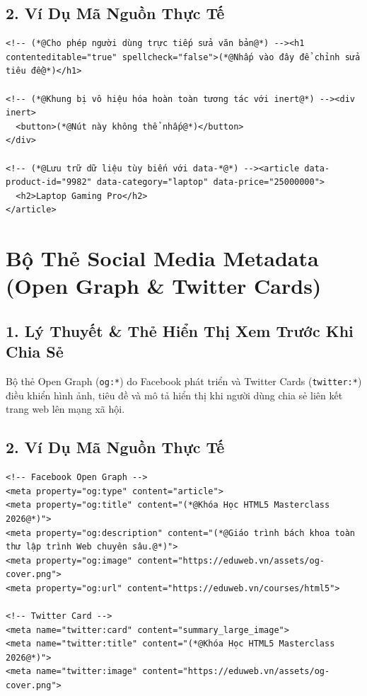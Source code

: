 \documentclass[11pt,oneside]{book}
\newcommand{\codeinline}[1]{\textcolor{accentOrange}{\texttt{#1}}}
\begin{document}
\subsection{2. Ví Dụ Mã Nguồn Thực Tế}
\begin{lstlisting}[language=HTML5, caption={Ví dụ ứng dụng các thuộc tính contenteditable, inert và data-*}]
<!-- (*@Cho phép người dùng trực tiếp sửa văn bản@*) --><h1 contenteditable="true" spellcheck="false">(*@Nhấp vào đây để chỉnh sửa tiêu đề@*)</h1>

<!-- (*@Khung bị vô hiệu hóa hoàn toàn tương tác với inert@*) --><div inert>
  <button>(*@Nút này không thể nhấp@*)</button>
</div>

<!-- (*@Lưu trữ dữ liệu tùy biến với data-*@*) --><article data-product-id="9982" data-category="laptop" data-price="25000000">
  <h2>Laptop Gaming Pro</h2>
</article>
\end{lstlisting}

\section{Bộ Thẻ Social Media Metadata (Open Graph \& Twitter Cards)}
\subsection{1. Lý Thuyết \& Thẻ Hiển Thị Xem Trước Khi Chia Sẻ}
Bộ thẻ Open Graph (\codeinline{og:*}) do Facebook phát triển và Twitter Cards (\codeinline{twitter:*}) điều khiển hình ảnh, tiêu đề và mô tả hiển thị khi người dùng chia sẻ liên kết trang web lên mạng xã hội.

\subsection{2. Ví Dụ Mã Nguồn Thực Tế}
\begin{lstlisting}[language=HTML5, caption={Ví dụ bộ thẻ Open Graph chuẩn khi chia sẻ Facebook/Zalo}]
<!-- Facebook Open Graph -->
<meta property="og:type" content="article">
<meta property="og:title" content="(*@Khóa Học HTML5 Masterclass 2026@*)">
<meta property="og:description" content="(*@Giáo trình bách khoa toàn thư lập trình Web chuyên sâu.@*)">
<meta property="og:image" content="https://eduweb.vn/assets/og-cover.png">
<meta property="og:url" content="https://eduweb.vn/courses/html5">

<!-- Twitter Card -->
<meta name="twitter:card" content="summary_large_image">
<meta name="twitter:title" content="(*@Khóa Học HTML5 Masterclass 2026@*)">
<meta name="twitter:image" content="https://eduweb.vn/assets/og-cover.png">
\end{lstlisting}
\end{document}

